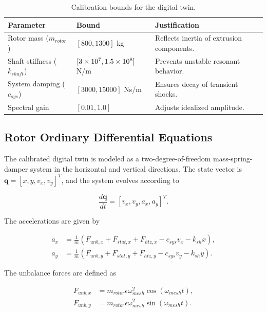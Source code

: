 \documentclass[journal,10pt,a4paper]{IEEEtran}
\begin{document}
\begin{table}[H]
\centering
\caption{Calibration bounds for the digital twin.}
\label{tab:calibration-bounds}
\begin{tabularx}{\columnwidth}{L{1.8cm} L{2.2cm} Y}
\toprule
\textbf{Parameter} & \textbf{Bound} & \textbf{Justification} \\
\midrule
Rotor mass ($m_{rotor}$) & $[800, 1300]$ kg & Reflects inertia of extrusion components. \\
\addlinespace
Shaft stiffness ($k_{shaft}$) & $[3 \times 10^7, \newline 1.5 \times 10^8]$ N/m & Prevents unstable resonant behavior. \\
\addlinespace
System damping ($c_{sys}$) & $[3000, 15000]$ \newline Ns/m & Ensures decay of transient shocks. \\
\addlinespace
Spectral gain & $[0.01, 1.0]$ & Adjusts idealized amplitude. \\
\bottomrule
\end{tabularx}
\end{table}

\subsection{Rotor Ordinary Differential Equations}
The calibrated digital twin is modeled as a two-degree-of-freedom mass-spring-damper system in the horizontal and vertical directions. The state vector is $\mathbf{q} = [x, y, v_x, v_y]^T$, and the system evolves according to

\begin{equation}
\frac{d\mathbf{q}}{dt} = [v_x, v_y, a_x, a_y]^T.
\end{equation}

The accelerations are given by

\begin{align}
 a_x &= \frac{1}{m}(F_{unb,x} + F_{stat,x} + F_{htz,x} - c_{sys}v_x - k_{sh}x), \\
 a_y &= \frac{1}{m}(F_{unb,y} + F_{stat,y} + F_{htz,y} - c_{sys}v_y - k_{sh}y).
\end{align}

The unbalance forces are defined as

\begin{align}
 F_{unb,x} &= m_{rotor}\epsilon\omega_{mesh}^2 \cos(\omega_{mesh} t), \\
 F_{unb,y} &= m_{rotor}\epsilon\omega_{mesh}^2 \sin(\omega_{mesh} t).
\end{align}
\end{document}
